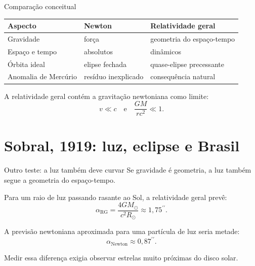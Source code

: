 \documentclass[aspectratio=169,10pt]{beamer}
\newcommand{\arcsec}{^{\prime\prime}}
\begin{document}
\begin{frame}{Comparação conceitual}
  \begin{table}
    \centering
    \begin{tabular}{lll}
      \toprule
      Aspecto & Newton & Relatividade geral \\
      \midrule
      Gravidade & força & geometria do espaço-tempo \\
      Espaço e tempo & absolutos & dinâmicos \\
      Órbita ideal & elipse fechada & quase-elipse precessante \\
      Anomalia de Mercúrio & resíduo inexplicado & consequência natural \\
      \bottomrule
    \end{tabular}
  \end{table}

  \vspace{0.35cm}
  A relatividade geral contém a gravitação newtoniana como limite:
  \[
    v \ll c
    \quad\text{e}\quad
    \frac{GM}{rc^2}\ll 1.
  \]
\end{frame}

\section{Sobral, 1919: luz, eclipse e Brasil}

\begin{frame}{Outro teste: a luz também deve curvar}
  Se gravidade é geometria, a luz também segue a geometria do espaço-tempo.

  \vspace{0.3cm}
  Para um raio de luz passando rasante ao Sol, a relatividade geral prevê:
  \[
    \alpha_{\text{RG}} =
    \frac{4GM_\odot}{c^2R_\odot}
    \approx 1{,}75\arcsec.
  \]

  \vspace{0.25cm}
  A previsão newtoniana aproximada para uma partícula de luz seria metade:
  \[
    \alpha_{\text{Newton}} \approx 0{,}87\arcsec.
  \]

  \vspace{0.3cm}
  Medir essa diferença exigia observar estrelas muito próximas do disco solar.
\end{frame}
\end{document}
